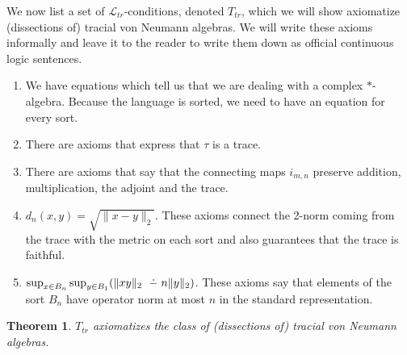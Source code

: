 \documentclass[12pt]{amsart}
\makeatletter
\newtheorem{thm}{Theorem}[section]
\newtheorem{fact}[thm]{Fact}
\theoremstyle{definition}
\newcommand{\dminus}{ 
\buildrel\textstyle\ .\over{\hbox{ 
\vrule height3pt depth0pt width0pt}{\smash-} 
}}
\def\cal{\mathcal}
\newcommand{\cstar}{$\mathrm{C}^*$}
\def\dotminussym#1#2{%
  \setbox0=\hbox{$\m@th#1-$}%
  \kern.5\wd0%
  \hbox to 0pt{\hss\hbox{$\m@th#1-$}\hss}%
  \raise.6\ht0\hbox to 0pt{\hss$\m@th#1.$\hss}%
  \kern.5\wd0}
\newcommand{\dotminus}{\mathbin{\mathpalette\dotminussym{}}}
\newcommand\cL{{\cal L}}
\newcommand\bN{{\mathbb N}}
\makeatother
\begin{document}
We now list a set of $\cL_{tr}$-conditions, denoted $T_{tr}$, which we will show axiomatize (dissections of) tracial von Neumann algebras.  We will write these axioms informally and leave it to the reader to write them down as official continuous logic sentences.
\begin{enumerate}
    \item We have equations which tell us that we are dealing with a complex $\ast$-algebra. Because the language is sorted, we need to have an equation for every sort.
    \item There are axioms that express that $\tau$ is a trace.
    \item There are axioms that say that the connecting maps $i_{m,n}$ preserve addition, multiplication, the adjoint and the trace.
    \item $d_n(x,y) = \sqrt{\|x - y\|_2}$. These axioms connect the 2-norm coming from the trace with the metric on each sort and also guarantees that the trace is faithful.
    \item\label{opnorm} $\sup_{x \in B_n} \sup_{y \in B_1} (\|xy\|_2 \dminus n\|y\|_2)$.  These axioms say that elements of the sort $B_n$ have operator norm at most $n$ in the standard representation.
\end{enumerate}


\begin{thm}
$T_{tr}$ axiomatizes the class of (dissections of) tracial von Neumann algebras.
\end{thm}
\end{document}
